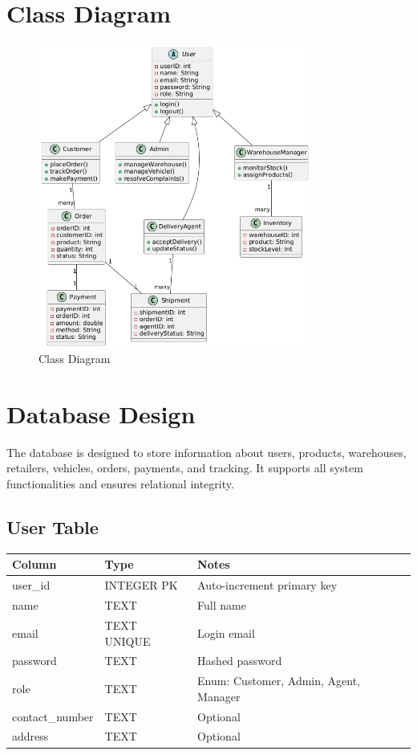 \documentclass[12pt,a4paper]{article}
\begin{document}
\section{Class Diagram}
\begin{figure}[H]
    \centering
    \includegraphics[width=0.8\textwidth]{classdiagram.jpg} 
    \caption{Class Diagram}
    \label{fig:classdiagram}
\end{figure}

\section{Database Design}
The database is designed to store information about users, products, warehouses, retailers, vehicles, orders, payments, and tracking. It supports all system functionalities and ensures relational integrity.

\subsection{User Table}
\begin{longtable}{|l|l|l|}
\hline
\textbf{Column} & \textbf{Type} & \textbf{Notes} \\
\hline
user\_id & INTEGER PK & Auto-increment primary key \\
name & TEXT & Full name \\
email & TEXT UNIQUE & Login email \\
password & TEXT & Hashed password \\
role & TEXT & Enum: Customer, Admin, Agent, Manager \\
contact\_number & TEXT & Optional \\
address & TEXT & Optional \\
\hline
\end{longtable}
\end{document}

